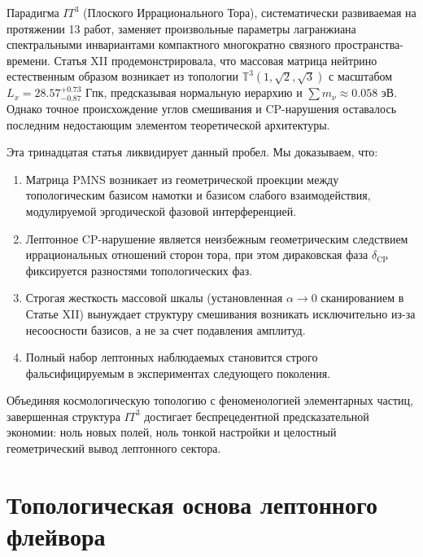 \documentclass[12pt,a4paper]{article}
\begin{document}
Парадигма $IT^3$ (Плоского Иррационального Тора), систематически развиваемая на протяжении 13 работ, заменяет произвольные параметры лагранжиана спектральными инвариантами компактного многократно связного пространства-времени. Статья XII продемонстрировала, что массовая матрица нейтрино естественным образом возникает из топологии $\mathbb{T}^3(1,\sqrt{2},\sqrt{3})$ с масштабом $L_x = 28.57^{+0.73}_{-0.87}$ Гпк, предсказывая нормальную иерархию и $\sum m_\nu \approx 0.058$ эВ. Однако точное происхождение углов смешивания и CP-нарушения оставалось последним недостающим элементом теоретической архитектуры.

Эта тринадцатая статья ликвидирует данный пробел. Мы доказываем, что:
\begin{enumerate}
    \item Матрица PMNS возникает из геометрической проекции между топологическим базисом намотки и базисом слабого взаимодействия, модулируемой эргодической фазовой интерференцией.
    \item Лептонное CP-нарушение является неизбежным геометрическим следствием иррациональных отношений сторон тора, при этом дираковская фаза $\delta_{\text{CP}}$ фиксируется разностями топологических фаз.
    \item Строгая жесткость массовой шкалы (установленная $\alpha \to 0$ сканированием в Статье XII) вынуждает структуру смешивания возникать исключительно из-за несоосности базисов, а не за счет подавления амплитуд.
    \item Полный набор лептонных наблюдаемых становится строго фальсифицируемым в экспериментах следующего поколения.
\end{enumerate}
Объединяя космологическую топологию с феноменологией элементарных частиц, завершенная структура $IT^3$ достигает беспрецедентной предсказательной экономии: ноль новых полей, ноль тонкой настройки и целостный геометрический вывод лептонного сектора.

\section{Топологическая основа лептонного флейвора}
\end{document}
